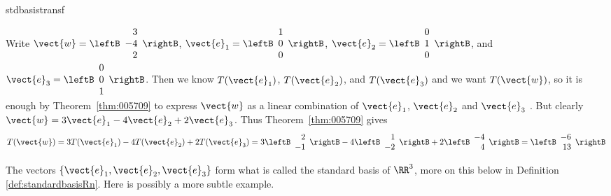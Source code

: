 \begin{example}{}{stdbasistransf}
\begin{solution}
  Write $\vect{w} = \leftB \begin{array}{r}
  3 \\
  -4 \\
  2
  \end{array} \rightB$, $\vect{e}_{1} = \leftB \begin{array}{r}
  1 \\
  0 \\
  0
  \end{array} \rightB$, $\vect{e}_{2} = \leftB \begin{array}{r}
0 \\
 1\\
 0
 \end{array} \rightB$, and $\vect{e}_{3} = \leftB \begin{array}{r}
0 \\
 0\\
 1
 \end{array} \rightB$. 
Then we know $T(\vect{e}_1)$, $T(\vect{e}_2)$,  and $T(\vect{e}_3)$ and we want $T(\vect{w})$, so it is enough by Theorem~\ref{thm:005709} to express $\vect{w}$ as a linear combination of $\vect{e}_1$, $\vect{e}_2$  and $\vect{e}_3$ .
But clearly $\vect{w} = 3\vect{e}_1 -4 \vect{e}_2 + 2\vect{e}_3$. 
 Thus Theorem~\ref{thm:005709} gives
\begin{equation*}
T(\vect{w}) = 3T(\vect{e}_1) -4 T(\vect{e}_2) + 2T(\vect{e}_3)
=3 \leftB \begin{array}{r}
2 \\
-1
\end{array} \rightB
-4  \leftB \begin{array}{r}
 1 \\
 -2
 \end{array} \rightB
 + 2  \leftB \begin{array}{r}
 -4 \\
 4
 \end{array} \rightB
 =  \leftB \begin{array}{r}
-6 \\
13
\end{array} \rightB
\end{equation*}
\end{solution}
\end{example}

The vectors $\{\vect{e}_1,\vect{e}_2,\vect{e}_3\}$ form what is called the standard basis of  $\RR^{3}$, more on this below in Definition \ref{def:standardbasisRn}. Here is possibly a more subtle example.

